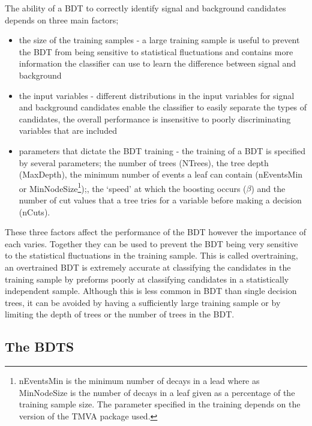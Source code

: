 The ability of a BDT to correctly identify signal and background candidates depends on three main factors;
\begin{itemize}
\item the size of the training samples - a large training sample is useful to prevent the BDT from being sensitive to statistical fluctuations and contains more information the classifier can use to learn the difference between signal and background
\item the input variables - different distributions in the input variables for signal and background candidates enable the classifier to easily separate the types of candidates, the overall performance is insensitive to poorly discriminating variables that are included
\item parameters that dictate the BDT training - the training of a BDT is specified by several parameters; the number of trees (NTrees), the tree depth (MaxDepth), the minimum number of events a leaf can contain (nEventsMin or MinNodeSize\footnote{nEventsMin is the minimum number of decays in a lead where as MinNodeSize is the number of decays in a leaf given as a percentage of the training sample size. The parameter specified in the training depends on the version of the TMVA package used. });, the `speed’ at which the boosting occurs ($\beta$) and the number of cut values that a tree tries for a variable before making a decision (nCuts).
\end{itemize}

These three factors affect the performance of the BDT however the importance of each varies. Together they can be used to prevent the BDT being very sensitive to the statistical fluctuations in the training sample. This  is called overtraining, an overtrained BDT is extremely accurate at classifying the candidates in the training sample by preforms poorly at classifying candidates in a statistically independent sample. Although this is less common in BDT than single decision trees, it can be avoided by having a sufficiently large training sample or by limiting the depth of trees or the number of trees in the BDT. 

\subsection{The BDTS}
\label{BDTS}

